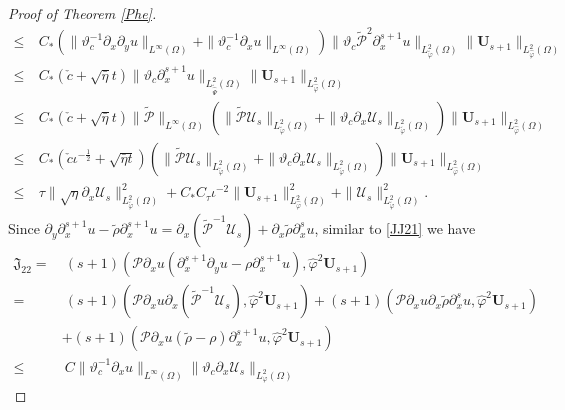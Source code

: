 \documentclass[10pt,a4paper]{amsart}
\begin{document}
\begin{proof}[Proof of Theorem \ref{Phe}]
\begin{align}
\leq&~C_{*}\left(\|\vartheta_{c}^{-1}\partial_{x}\partial_{y}u\|_{L^{\infty}(\Omega)}+\|\vartheta_{c}^{-1}\partial_{x}u\|_{L^{\infty}(\Omega)}\right)
      \|\vartheta_{c}\tilde{\mathcal{P}}^{2}\partial_{x}^{s+1}u\|_{L_{\tilde{\varphi}}^{2}(\Omega)}\|\mathbf{U}_{s+1}\|_{L_{\hat{\varphi}}^{2}(\Omega)}\nonumber\\
\leq&~C_{*}(\check{c}+\sqrt{\bar{\eta}}t)
      \|\vartheta_{c}\partial_{x}^{s+1}u\|_{L_{\tilde{\hat{\Psi}}}^{2}(\Omega)}\|\mathbf{U}_{s+1}\|_{L_{\hat{\varphi}}^{2}(\Omega)}\nonumber\\
\leq&~C_{*}(\check{c}+\sqrt{\bar{\eta}}t)\|\tilde{\mathcal{P}}\|_{L^{\infty}(\Omega)}
      \left(\|\tilde{\mathcal{P}}\mathcal{U}_{s}\|_{L_{\tilde{\varphi}}^{2}(\Omega)}+\|\vartheta_{c}\partial_{x}\mathcal{U}_{s}\|_{L_{\tilde{\varphi}}^{2}(\Omega)}\right)
      \|\mathbf{U}_{s+1}\|_{L_{\hat{\varphi}}^{2}(\Omega)}\nonumber\\
\leq&~C_{*}(\check{c}\iota^{-\frac{1}{2}}+\sqrt{\bar{\eta}t})
      \left(\|\tilde{\mathcal{P}}\mathcal{U}_{s}\|_{L_{\tilde{\varphi}}^{2}(\Omega)}+\|\vartheta_{c}\partial_{x}\mathcal{U}_{s}\|_{L_{\tilde{\varphi}}^{2}(\Omega)}\right)
      \|\mathbf{U}_{s+1}\|_{L_{\hat{\varphi}}^{2}(\Omega)}\nonumber\\
\leq&~\tau\|\sqrt{\eta}\partial_{x}\mathcal{U}_{s}\|_{L_{\tilde{\varphi}}^{2}(\Omega)}^{2}
     +C_{*}C_{\tau}\iota^{-2}\|\mathbf{U}_{s+1}\|_{L_{\hat{\varphi}}^{2}(\Omega)}^{2}
     +\|\mathcal{U}_{s}\|_{L_{\tilde{\varphi}}^{2}(\Omega)}^{2}.\nonumber
\end{align}
Since $\partial_{y}\partial_{x}^{s+1}u-\tilde{\rho}\partial_{x}^{s+1}u=\partial_{x}(\tilde{\mathcal{P}}^{-1}\mathcal{U}_{s})+\partial_{x}\tilde{\rho}\partial_{x}^{s}u$,
similar to \eqref{JJ21} we have
\begin{align}\label{JJ22}
\mathfrak{J}_{22}
=&~(s+1)(\mathcal{P}\partial_{x}u(\partial_{x}^{s+1}\partial_{y}u-\rho\partial_{x}^{s+1}u),\hat{\varphi}^{2}\mathbf{U}_{s+1})\\
=&~(s+1)(\mathcal{P}\partial_{x}u\partial_{x}(\tilde{\mathcal{P}}^{-1}\mathcal{U}_{s}),\hat{\varphi}^{2}\mathbf{U}_{s+1})
  +(s+1)(\mathcal{P}\partial_{x}u\partial_{x}\tilde{\rho}\partial_{x}^{s}u,\hat{\varphi}^{2}\mathbf{U}_{s+1})\nonumber\\
 &+(s+1)(\mathcal{P}\partial_{x}u(\tilde{\rho}-\rho)\partial_{x}^{s+1}u,\hat{\varphi}^{2}\mathbf{U}_{s+1})\nonumber\\
\leq&~C\|\vartheta_{c}^{-1}\partial_{x}u\|_{L^{\infty}(\Omega)}
       \|\vartheta_{c}\partial_{x}\mathcal{U}_{s}\|_{L_{\varphi}^{2}(\Omega)}

\end{align}
\end{proof}
\end{document}
